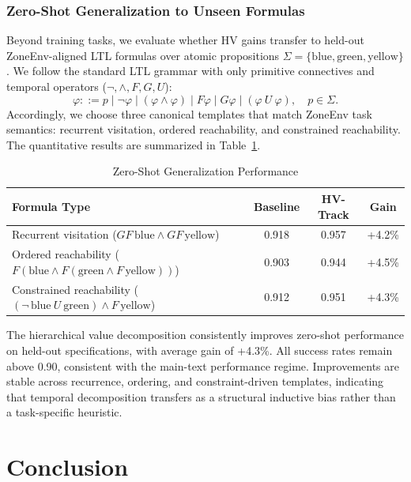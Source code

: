 \documentclass[journal]{IEEEtran}
\begin{document}
\subsubsection{Zero-Shot Generalization to Unseen Formulas}
\label{app:generalization}

Beyond training tasks, we evaluate whether HV gains transfer to held-out ZoneEnv-aligned LTL formulas over atomic propositions $\Sigma=\{\text{blue},\text{green},\text{yellow}\}$. We follow the standard LTL grammar with only primitive connectives and temporal operators ($\neg,\land,F,G,U$):
\[
\varphi ::= p \mid \neg\varphi \mid (\varphi\land\varphi) \mid F\varphi \mid G\varphi \mid (\varphi\ U\ \varphi),\quad p\in\Sigma.
\]
Accordingly, we choose three canonical templates that match ZoneEnv task semantics: recurrent visitation, ordered reachability, and constrained reachability.
The quantitative results are summarized in Table~\ref{tab:zero_shot_gen}.

\begin{table}[h]
\centering
\caption{Zero-Shot Generalization Performance}
\label{tab:zero_shot_gen}
\begin{tabular}{@{}lccc@{}}
	\toprule
	\textbf{Formula Type} & \textbf{Baseline} & \textbf{HV-Track} & \textbf{Gain} \\ \midrule
Recurrent visitation ($G F\,\text{blue}\land G F\,\text{yellow}$) & 0.918 & 0.957 & +4.2\% \\
Ordered reachability ($F(\text{blue}\land F(\text{green}\land F\,\text{yellow}))$) & 0.903 & 0.944 & +4.5\% \\
Constrained reachability ($(\neg\,\text{blue}\ U\ \text{green})\land F\,\text{yellow}$) & 0.912 & 0.951 & +4.3\% \\ \bottomrule
\end{tabular}
\end{table}

The hierarchical value decomposition consistently improves zero-shot performance on held-out specifications, with average gain of +4.3\%. All success rates remain above 0.90, consistent with the main-text performance regime. Improvements are stable across recurrence, ordering, and constraint-driven templates, indicating that temporal decomposition transfers as a structural inductive bias rather than a task-specific heuristic.


\section{Conclusion}
\label{sec:conclusion}
\end{document}
